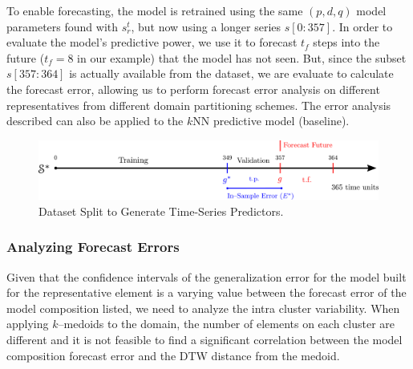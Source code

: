 To enable forecasting, the model is retrained using the same $(p, d, q)$ model parameters found with $s^t_r$, but now using a longer series $s[0:357]$. In order to evaluate the model's predictive power, we use it to forecast $t_f$ steps into the future ($t_f = 8$ in our example) that the model has not seen. But, since the subset $s[357:364]$ is actually available from the dataset, we are evaluate to calculate the forecast error, allowing us to perform forecast error analysis on different representatives from different domain partitioning schemes. The error analysis described can also be applied to the $k$NN predictive model (baseline).
 
\begin{figure}[h]
	\centering
	\includegraphics[scale=0.35]{../Figures/ModelRegion_ModelTS}
	\caption{Dataset Split to Generate Time-Series Predictors.}
	\label{Fig:Time-SeriesModel}
\end{figure}

\subsubsection{Analyzing Forecast Errors}

Given that the confidence intervals of the generalization error for the model built for the representative element is a varying value between the forecast error of the model composition listed, we need to analyze the intra cluster variability. When applying $k$--medoids to the domain, the number of elements on each cluster are different and it is not feasible to find a significant correlation between the model composition forecast error and the DTW distance from the medoid.

